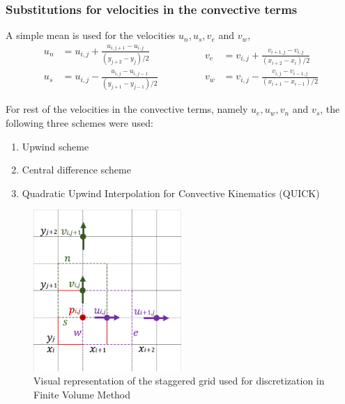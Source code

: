 \documentclass[12pt,a4paper,fleqn]{article}
\begin{document}
\subsubsection{Substitutions for velocities in the convective terms}
A simple mean is used for the velocities $u_n, u_s, v_e$ and $v_w$,
\begin{equation*}
\begin{aligned}
u_n &= u_{i,j} + \frac{u_{i,j+1} - u_{i,j}}{(y_{j+2}-y_j)/2}\\
u_s &= u_{i,j} - \frac{u_{i,j} - u_{i,j-1}}{(y_{j+1}-y_{j-1})/2}
\end{aligned}
\qquad\qquad
\begin{aligned}
v_e &= v_{i,j} + \frac{v_{i+1,j} - v_{i,j}}{(x_{i+2}-x_i)/2}\\
v_w &= v_{i,j} - \frac{v_{i,j} - v_{i-1,j}}{(x_{i+1}-x_{i-1})/2}
\end{aligned}
\end{equation*}

For rest of the velocities in the convective terms, namely $u_e, u_w, v_n$ and $v_s$, the following three schemes were used:
\begin{enumerate}
\setlength\itemsep{0em}
\item Upwind scheme
\item Central difference scheme
\item Quadratic Upwind Interpolation for Convective Kinematics (QUICK)
\end{enumerate}

\begin{figure}[H]
  \centering
  \includegraphics[width=0.5\textwidth]{staggered_grid.png}
  \caption{Visual representation of the staggered grid used for discretization in Finite Volume Method}
  \label{fig:staggered-grid}
\end{figure}
\end{document}
